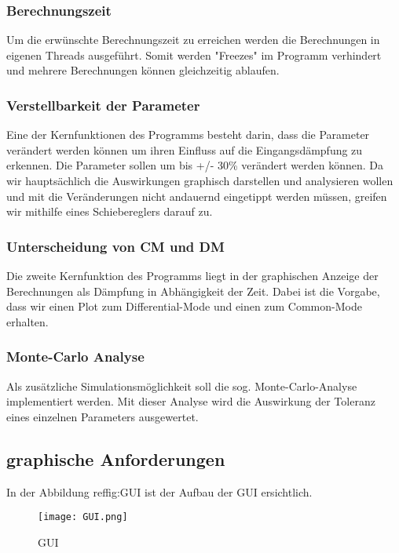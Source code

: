 \subsubsection{Berechnungszeit}\label{subsubsec:berechnungszeit}
Um die erwünschte Berechnungszeit zu erreichen werden die Berechnungen in eigenen Threads ausgeführt. Somit werden "Freezes" im Programm verhindert und mehrere Berechnungen können gleichzeitig ablaufen. 
\bigskip
\subsubsection{Verstellbarkeit der Parameter}\label{subsubsec:verstellbarkeitderparameter}
Eine der Kernfunktionen des Programms besteht darin, dass die Parameter verändert werden können um ihren Einfluss auf die Eingangsdämpfung zu erkennen. Die Parameter sollen um bis +/- 30\% verändert werden können. Da wir hauptsächlich die Auswirkungen graphisch darstellen und analysieren wollen und mit die Veränderungen nicht andauernd eingetippt werden müssen, greifen wir mithilfe eines Schiebereglers darauf zu. 
\bigskip
\subsubsection{Unterscheidung von CM und DM}\label{subsubsec:unterschiedCmDm}
Die zweite Kernfunktion des Programms liegt in der graphischen Anzeige der Berechnungen als Dämpfung in Abhängigkeit der Zeit. Dabei ist die Vorgabe, dass wir einen Plot zum Differential-Mode und einen zum Common-Mode erhalten.
		
\bigskip
\subsubsection{Monte-Carlo Analyse}\label{subsubsec:montecarlo}
Als zusätzliche Simulationsmöglichkeit soll die sog. Monte-Carlo-Analyse implementiert werden. Mit dieser Analyse wird die Auswirkung der Toleranz eines einzelnen Parameters ausgewertet. 
		
		
\subsection{graphische Anforderungen} \label{subsec:graphischeanforderungen}
In der Abbildung ref{fig:GUI} ist der Aufbau der GUI ersichtlich.

\begin{figure}[H]
	\centering
	\texttt{[image: GUI.png]}
	\caption{GUI}
	\label{fig:GUI}
\end{figure}

